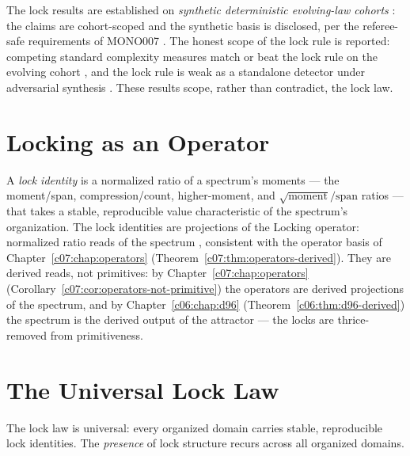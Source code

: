 The lock results are established on \emph{synthetic deterministic evolving-law cohorts}
\cite{c08:QG315,c08:QG316}: the claims are cohort-scoped and the synthetic basis is disclosed,
per the referee-safe requirements of MONO007 \cite{c08:MONO007}. The honest scope of the lock
rule is reported: competing standard complexity measures match or beat the lock rule on the
evolving cohort \cite{c08:QG319.1}, and the lock rule is weak as a standalone detector under
adversarial synthesis \cite{c08:QG319}. These results scope, rather than contradict, the
lock law.

\section{Locking as an Operator}
\label{c08:sec:locking-operator}

\begin{theorem}
\label{c08:thm:locks-locking}
A \emph{lock identity} is a normalized ratio of a spectrum's moments --- the moment/span,
compression/count, higher-moment, and $\sqrt{\text{moment}}/\text{span}$ ratios --- that
takes a stable, reproducible value characteristic of the spectrum's organization. The lock
identities are projections of the Locking operator: normalized ratio reads of the spectrum
\cite{c08:QG313}, consistent with the operator basis of Chapter~\ref{c07:chap:operators}
(Theorem~\ref{c07:thm:operators-derived}). They are derived reads, not primitives: by
Chapter~\ref{c07:chap:operators} (Corollary~\ref{c07:cor:operators-not-primitive}) the
operators are derived projections of the spectrum, and by Chapter~\ref{c06:chap:d96}
(Theorem~\ref{c06:thm:d96-derived}) the spectrum is the derived output of the attractor ---
the locks are thrice-removed from primitiveness.
\end{theorem}

\section{The Universal Lock Law}
\label{c08:sec:universal-law}

\begin{theorem}
\label{c08:thm:lock-law-universal}
The lock law is universal: every organized domain carries stable, reproducible lock
identities. The \emph{presence} of lock structure recurs across all organized domains.
\end{theorem}

